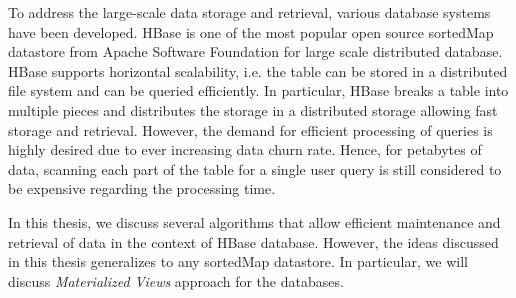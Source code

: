 \documentclass[11pt,a4paper,bibtotoc,idxtotoc,headsepline,footsepline,footexclude,BCOR12mm,DIV13]{scrbook}
\begin{document}
To address the large-scale data storage and retrieval, various database systems have been developed. HBase is one of the most popular open source sortedMap datastore from Apache Software Foundation \cite{george:hbase} for large scale distributed database. HBase supports horizontal scalability, i.e. the table can be stored in a distributed file system and can be queried  efficiently. In particular, HBase breaks a table into multiple pieces and distributes the storage in a distributed storage allowing fast storage and retrieval.  However, the demand for efficient processing of queries is highly desired due to ever increasing data churn rate. Hence, for petabytes of data, scanning each part of the table for a single user query is still considered to be expensive regarding the processing time. 

In this thesis, we discuss several algorithms that allow efficient maintenance and retrieval of data in the context of HBase database. However, the ideas discussed in this thesis generalizes to any sortedMap datastore. In particular, we will  discuss 
\emph{Materialized  Views} approach for the databases.


\end{document}
